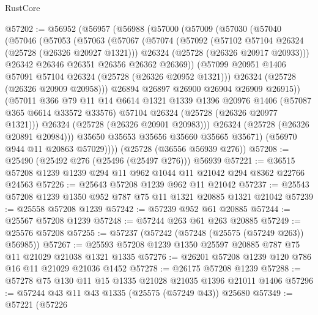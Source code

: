 \begin{lexlean}{RustCore}
\begin{coremodule}
@57202 := @56952
    (@56957
      (@56988
        (@57000
          (@57009
            (@57030
              (@57040
                (@57046
                  (@57053
                    (@57063
                      (@57067
                        (@57074
                          (@57092
                            (@57102 @57104 @26324 (@25728 (@26326 @20927 @1321)))
                            @26324
                            (@25728 (@26326 @20917 @20933)))
                          @26342
                          @26346
                          @26351
                          @26356
                          @26362
                          @26369))
                      (@57099 @20951 @1406 @57091 @57104 @26324 (@25728 (@26326 @20952 @1321)))
                      @26324
                      (@25728 (@26326 @20909 @20958)))
                    @26894
                    @26897
                    @26900
                    @26904
                    @26909
                    @26915))
                (@57011
                  @366
                  @79
                  @11
                  @14
                  @6614
                  @1321
                  @1339
                  @1396
                  @20976
                  @1406
                  (@57087 @365 @6614 @33572 @33576)
                  @57104
                  @26324
                  (@25728 (@26326 @20977 @1321)))
                @26324
                (@25728 (@26326 @20901 @20983)))
              @26324
              (@25728 (@26326 @20891 @20984)))
            @35650
            @35653
            @35656
            @35660
            @35665
            @35671)
          (@56970 @944 @11 @20863 @57029))))
    (@25728 (@36556 @56939 @276))
@57208 := @25490 (@25492 @276 (@25496 (@25497 @276))) @56939
@57221 := @36515 @57208 @1239 @1239 @294 @11 @962 @1044 @11 @21042 @294 @8362 @22766 @24563
@57226 := @25643 @57208 @1239 @962 @11 @21042
@57237 := @25543 @57208 @1239 @1350 @952 @787 @75 @11 @1321 @20885 @1321 @21042
@57239 := @25558 @57208 @1239
@57242 := @57239 @952 @61 @20885
@57244 := @25567 @57208 @1239
@57248 := @57244 @263 @61 @263 @20885
@57249 := @25576 @57208
@57255 := @57237 (@57242 (@57248 (@25575 (@57249 @263)) @56985))
@57267 := @25593 @57208 @1239 @1350 @25597 @20885 @787 @75 @11 @21029 @21038 @1321 @1335
@57276 := @26201 @57208 @1239 @120 @786 @16 @11 @21029 @21036 @1452
@57278 := @26175 @57208 @1239
@57288 := @57278 @75 @130 @11 @15 @1335 @21028 @21035 @1396 @21011 @1406
@57296 := @57244 @43 @11 @43 @1335 (@25575 (@57249 @43)) @25680
@57349 := @57221
    (@57226

\end{coremodule}
\end{lexlean}
